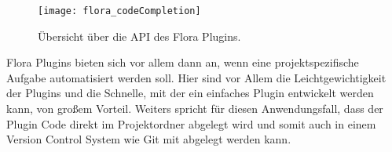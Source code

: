 \begin{figure}
    \centering
    \texttt{[image: flora\_codeCompletion]}
    \caption{Übersicht über die API des Flora Plugins.}
    \label{fig:FloraPluginAPI}
\end{figure}    
 
Flora Plugins bieten sich vor allem dann an, wenn eine projektspezifische 
Aufgabe automatisiert werden soll. Hier sind vor Allem die 
Leichtgewichtigkeit der Plugins und die Schnelle, mit der ein 
einfaches Plugin entwickelt werden kann, von großem Vorteil. 
Weiters spricht für diesen Anwendungsfall, dass der Plugin Code 
direkt im Projektordner abgelegt wird und somit auch in einem Version 
Control System wie Git mit abgelegt werden kann.
